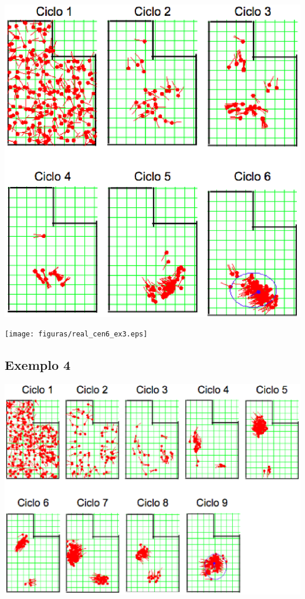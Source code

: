 {\centering
\includegraphics[scale=0.4]{figuras/cen6_ex3.eps}
\label{img:cen6_ex3}
\par}

{\centering
\texttt{[image: figuras/real\_cen6\_ex3.eps]}
\label{img:real_cen6_ex3}
\par}

\subsection{Exemplo 4}

{\centering
\includegraphics[scale=0.4]{figuras/cen6_ex4.eps}
\label{img:cen6_ex4}
\par}

